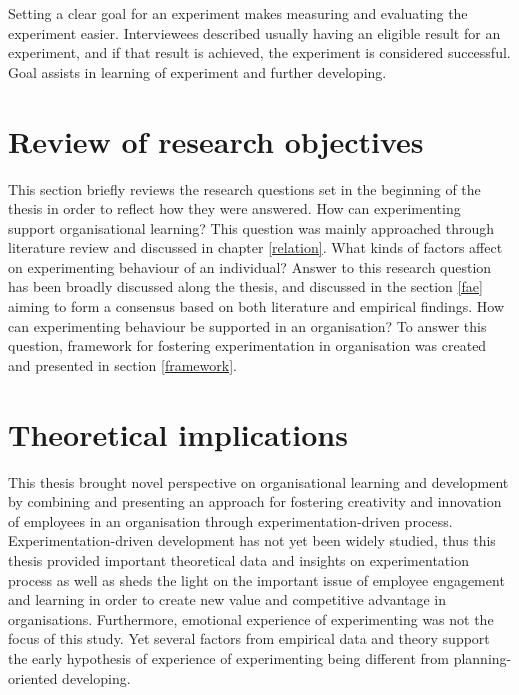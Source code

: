 Setting a clear goal for an experiment makes measuring and evaluating the experiment easier. Interviewees described usually having an eligible result for an experiment, and if that result is achieved, the experiment is considered successful. Goal assists in learning of experiment and further developing. 

\section{Review of research objectives}
This section briefly reviews the research questions set in the beginning of the thesis in order to reflect how they were answered. 
\newline
\newline
How can experimenting support organisational learning? \newline
\newline
This question was mainly approached through literature review and discussed in chapter \ref{relation}. 
\newline
\newline
What kinds of factors affect on experimenting behaviour of an individual?\newline
\newline
Answer to this research question has been broadly discussed along the thesis, and discussed in the section \ref{fae} aiming to form a consensus based on both literature and empirical findings. 
\newline
\newline
How can experimenting behaviour be supported in an organisation? \newline
\newline
To answer this question, framework for fostering experimentation in organisation was created and presented in section \ref{framework}. 

\section{Theoretical implications}
This thesis brought novel perspective on organisational learning and development by combining and presenting an approach for fostering creativity and innovation of employees in an organisation through experimentation-driven process. 
Experimentation-driven development has not yet been widely studied, thus this thesis provided important theoretical data and insights on experimentation process as well as sheds the light on the important issue of employee engagement and learning in order to create new value and competitive advantage in organisations. Furthermore, emotional experience of experimenting was not the focus of this study. Yet several factors from empirical data and theory support the early hypothesis of experience of experimenting being different from planning-oriented developing. 

